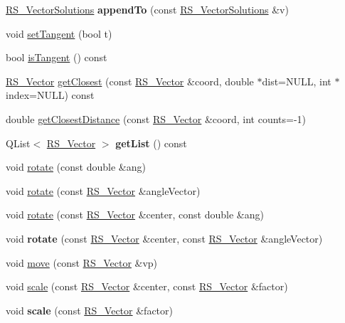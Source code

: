 \begin{DoxyCompactItemize}
\item 
\hypertarget{classRS__VectorSolutions_ac17c9831a24ede48cc77bc43ece933e9}{\hyperlink{classRS__VectorSolutions}{R\-S\-\_\-\-Vector\-Solutions} {\bfseries append\-To} (const \hyperlink{classRS__VectorSolutions}{R\-S\-\_\-\-Vector\-Solutions} \&v)}\label{classRS__VectorSolutions_ac17c9831a24ede48cc77bc43ece933e9}

\item 
void \hyperlink{classRS__VectorSolutions_a144cdc613de98bbb942bdda683b22292}{set\-Tangent} (bool t)
\item 
bool \hyperlink{classRS__VectorSolutions_af56caeddb578ce693679e8c8ad88630a}{is\-Tangent} () const 
\item 
\hyperlink{classRS__Vector}{R\-S\-\_\-\-Vector} \hyperlink{classRS__VectorSolutions_a90f40d73f2aee013412193d84fdf6f63}{get\-Closest} (const \hyperlink{classRS__Vector}{R\-S\-\_\-\-Vector} \&coord, double $\ast$dist=N\-U\-L\-L, int $\ast$index=N\-U\-L\-L) const 
\item 
double \hyperlink{classRS__VectorSolutions_aa1b8cc1b6db9305c69aec06e923726e4}{get\-Closest\-Distance} (const \hyperlink{classRS__Vector}{R\-S\-\_\-\-Vector} \&coord, int counts=-\/1)
\item 
\hypertarget{classRS__VectorSolutions_a778c62f54851cdfbc061a3449b6335dd}{Q\-List$<$ \hyperlink{classRS__Vector}{R\-S\-\_\-\-Vector} $>$ {\bfseries get\-List} () const }\label{classRS__VectorSolutions_a778c62f54851cdfbc061a3449b6335dd}

\item 
void \hyperlink{classRS__VectorSolutions_afd7945d9afc73942818ee5f83adca58d}{rotate} (const double \&ang)
\item 
void \hyperlink{classRS__VectorSolutions_a1bfcc1dea08ef972dfde6e96357d8a97}{rotate} (const \hyperlink{classRS__Vector}{R\-S\-\_\-\-Vector} \&angle\-Vector)
\item 
void \hyperlink{classRS__VectorSolutions_acb961af29a6169e847fc3c2ffa0ff314}{rotate} (const \hyperlink{classRS__Vector}{R\-S\-\_\-\-Vector} \&center, const double \&ang)
\item 
\hypertarget{classRS__VectorSolutions_abd164eb641ae4508c93b522d6ccf72a6}{void {\bfseries rotate} (const \hyperlink{classRS__Vector}{R\-S\-\_\-\-Vector} \&center, const \hyperlink{classRS__Vector}{R\-S\-\_\-\-Vector} \&angle\-Vector)}\label{classRS__VectorSolutions_abd164eb641ae4508c93b522d6ccf72a6}

\item 
void \hyperlink{classRS__VectorSolutions_aeee77664b790de7d6728d8d7e13f46fa}{move} (const \hyperlink{classRS__Vector}{R\-S\-\_\-\-Vector} \&vp)
\item 
void \hyperlink{classRS__VectorSolutions_ab9d33b6f218a9f8e051e359abdec1841}{scale} (const \hyperlink{classRS__Vector}{R\-S\-\_\-\-Vector} \&center, const \hyperlink{classRS__Vector}{R\-S\-\_\-\-Vector} \&factor)
\item 
\hypertarget{classRS__VectorSolutions_a53c688a578583ae619dda5ed37bac9ef}{void {\bfseries scale} (const \hyperlink{classRS__Vector}{R\-S\-\_\-\-Vector} \&factor)}\label{classRS__VectorSolutions_a53c688a578583ae619dda5ed37bac9ef}


\end{DoxyCompactItemize}
